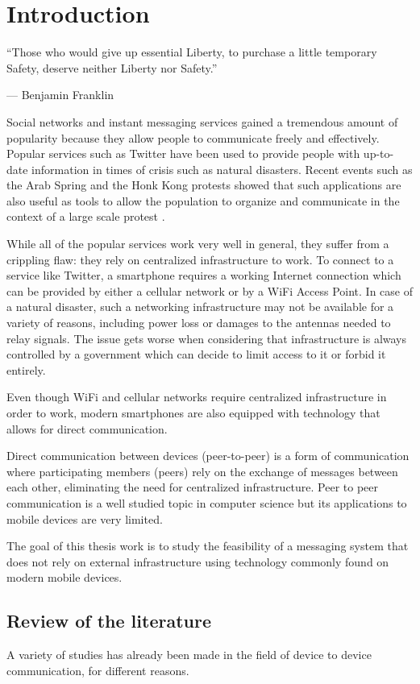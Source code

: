 \chapter{Introduction}

\epigraph{``Those who would give up essential Liberty, to purchase a little temporary Safety, deserve neither Liberty nor Safety.''}{--- \textup{Benjamin Franklin} }

Social networks and instant messaging services gained a tremendous amount of popularity because they allow people to communicate freely and effectively.
Popular services such as Twitter have been used to provide people with up-to-date information in times of crisis such as natural disasters.
Recent events such as the Arab Spring and the Honk Kong protests showed that such applications are also useful as tools to allow the population to organize and communicate in the context of a large scale protest \cite{firechat_hk}.

While all of the popular services work very well in general, they suffer from a crippling flaw: they rely on centralized infrastructure to work.
To connect to a service like Twitter, a smartphone requires a working Internet connection which can be provided by either a cellular network or by a WiFi Access Point.
In case of a natural disaster, such a networking infrastructure may not be available for a variety of reasons, including power loss or damages to the antennas needed to relay signals.
The issue gets worse when considering that infrastructure is always controlled by a government which can decide to limit access to it or forbid it entirely.

Even though WiFi and cellular networks require centralized infrastructure in order to work, modern smartphones are also equipped with technology that allows for direct communication.

Direct communication between devices (peer-to-peer) is a form of communication where participating members (peers) rely on the exchange of messages between each other, eliminating the need for centralized infrastructure.
Peer to peer communication is a well studied topic in computer science but its applications to mobile devices are very limited.

The goal of this thesis work is to study the feasibility of a messaging system that does not rely on external infrastructure using technology commonly found on modern mobile devices.

\section{Review of the literature}
A variety of studies has already been made in the field of device to device communication, for different reasons.

